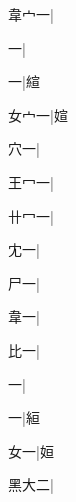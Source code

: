 \begin{multicols}{2}
{{\cjk{}韋{宀}一}|{}\par
{一}|{}\par
{一}|{\cjk{}縇}\par
{\cjk{}女{宀}一}|{\cjk{}媗}\par
{\cjk{}{\cnsym{}　}穴一}|{}\par
{\cjk{}王{\cnxHanaA{}冖}一}|{}\par
{\cjk{}卄{\cnxHanaA{}冖}一}|{}\par
{\cjk{}{\cnsym{}　}冘一}|{}\par
{\cjk{}{\cnsym{}　}尸一}|{}\par
{\cjk{}{\cnsym{}　}韋一}|{}\par
{比一}|{}\par
{一}|{}\par
{一}|{\cjk{}絙}\par
{\cjk{}{\cnsym{}　}女一}|{\cjk{}姮}\par
{\cjk{}黑大二}|{}\par
}
\end{multicols}
